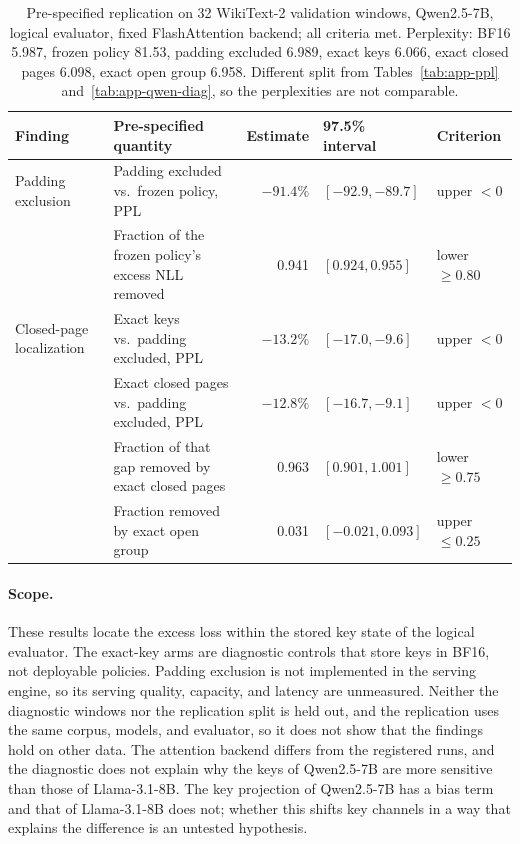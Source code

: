 \documentclass{article}
\begin{document}
\begin{table}[t]
\centering
\small
\begin{tabular}{@{}llrll@{}}
\toprule
Finding & Pre-specified quantity & Estimate & 97.5\% interval & Criterion \\
\midrule
Padding exclusion & Padding excluded vs.\ frozen policy, PPL & $-91.4\%$ & $[-92.9, -89.7]$ & upper $< 0$ \\
 & Fraction of the frozen policy's excess NLL removed & 0.941 & $[0.924, 0.955]$ & lower $\ge 0.80$ \\
Closed-page localization & Exact keys vs.\ padding excluded, PPL & $-13.2\%$ & $[-17.0, -9.6]$ & upper $< 0$ \\
 & Exact closed pages vs.\ padding excluded, PPL & $-12.8\%$ & $[-16.7, -9.1]$ & upper $< 0$ \\
 & Fraction of that gap removed by exact closed pages & 0.963 & $[0.901, 1.001]$ & lower $\ge 0.75$ \\
 & Fraction removed by exact open group & 0.031 & $[-0.021, 0.093]$ & upper $\le 0.25$ \\
\bottomrule
\end{tabular}
\caption{Pre-specified replication on 32 WikiText-2 validation windows, Qwen2.5-7B, logical evaluator,
fixed FlashAttention backend; all criteria met. Perplexity: BF16 5.987, frozen policy 81.53, padding
excluded 6.989, exact keys 6.066, exact closed pages 6.098, exact open group 6.958. Different split from
Tables~\ref{tab:app-ppl} and~\ref{tab:app-qwen-diag}, so the perplexities are not comparable.}
\label{tab:app-qwen-rep}
\end{table}

\paragraph{Scope.}
These results locate the excess loss within the stored key state of the logical evaluator. The
exact-key arms are diagnostic controls that store keys in BF16, not deployable policies. Padding
exclusion is not implemented in the serving engine, so its serving quality, capacity, and latency are
unmeasured. Neither the diagnostic windows nor the replication split is held out, and the replication
uses the same corpus, models, and evaluator, so it does not show that the findings hold on other data.
The attention backend differs from the registered runs, and the diagnostic does not explain why the
keys of Qwen2.5-7B are more sensitive than those of Llama-3.1-8B. The key projection of Qwen2.5-7B has
a bias term and that of Llama-3.1-8B does not; whether this shifts key channels in a way that explains
the difference is an untested hypothesis.
\end{document}
